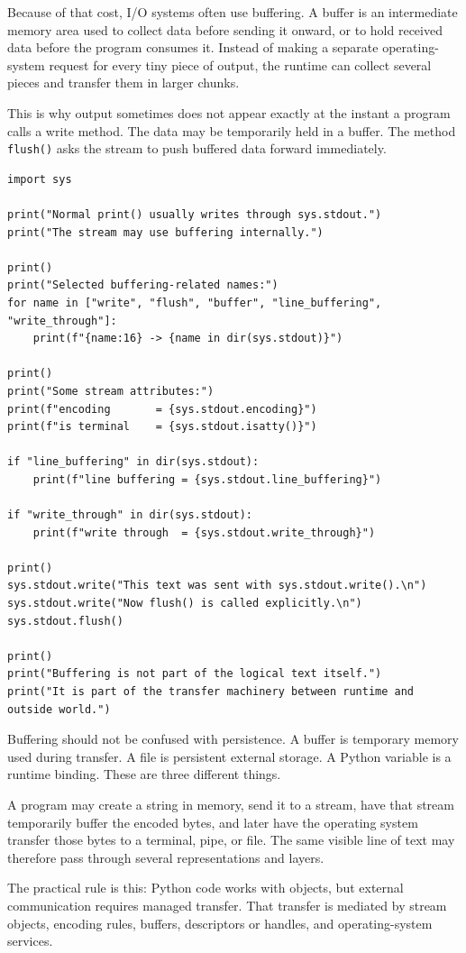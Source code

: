 Because of that cost, I/O systems often use buffering. A buffer is an intermediate memory area used to collect data before sending it onward, or to hold received data before the program consumes it. Instead of making a separate operating-system request for every tiny piece of output, the runtime can collect several pieces and transfer them in larger chunks.

This is why output sometimes does not appear exactly at the instant a program calls a write method. The data may be temporarily held in a buffer. The method \texttt{flush()} asks the stream to push buffered data forward immediately.

\begin{verbatim}
import sys

print("Normal print() usually writes through sys.stdout.")
print("The stream may use buffering internally.")

print()
print("Selected buffering-related names:")
for name in ["write", "flush", "buffer", "line_buffering", "write_through"]:
    print(f"{name:16} -> {name in dir(sys.stdout)}")

print()
print("Some stream attributes:")
print(f"encoding       = {sys.stdout.encoding}")
print(f"is terminal    = {sys.stdout.isatty()}")

if "line_buffering" in dir(sys.stdout):
    print(f"line buffering = {sys.stdout.line_buffering}")

if "write_through" in dir(sys.stdout):
    print(f"write through  = {sys.stdout.write_through}")

print()
sys.stdout.write("This text was sent with sys.stdout.write().\n")
sys.stdout.write("Now flush() is called explicitly.\n")
sys.stdout.flush()

print()
print("Buffering is not part of the logical text itself.")
print("It is part of the transfer machinery between runtime and outside world.")
\end{verbatim}

Buffering should not be confused with persistence. A buffer is temporary memory used during transfer. A file is persistent external storage. A Python variable is a runtime binding. These are three different things.

A program may create a string in memory, send it to a stream, have that stream temporarily buffer the encoded bytes, and later have the operating system transfer those bytes to a terminal, pipe, or file. The same visible line of text may therefore pass through several representations and layers.

The practical rule is this: Python code works with objects, but external communication requires managed transfer. That transfer is mediated by stream objects, encoding rules, buffers, descriptors or handles, and operating-system services.